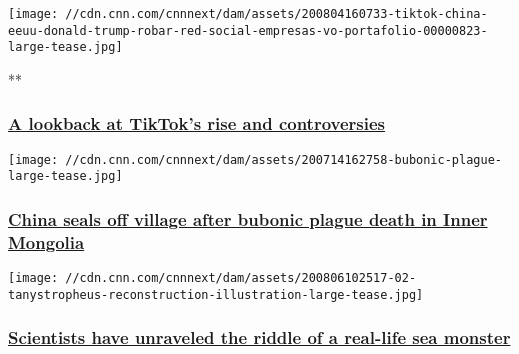 \href{/videos/tech/2020/08/07/trump-us-ban-tiktok-china-gold-intl-hnk-vpx.cnn}{}

\texttt{[image: //cdn.cnn.com/cnnnext/dam/assets/200804160733-tiktok-china-eeuu-donald-trump-robar-red-social-empresas-vo-portafolio-00000823-large-tease.jpg]}

**

\hypertarget{a-lookback-at-tiktoks-rise-and-controversies}{%
\subsubsection{\texorpdfstring{\href{/videos/tech/2020/08/07/trump-us-ban-tiktok-china-gold-intl-hnk-vpx.cnn}{A
lookback at TikTok's rise and
controversies}}{A lookback at TikTok's rise and controversies}}\label{a-lookback-at-tiktoks-rise-and-controversies}}

\href{/2020/08/07/asia/china-mongolia-bubonic-plague-death-intl-hnk-scli-scn/index.html}{}

\texttt{[image: //cdn.cnn.com/cnnnext/dam/assets/200714162758-bubonic-plague-large-tease.jpg]}

\hypertarget{china-seals-off-village-after-bubonic-plague-death-in-inner-mongolia}{%
\subsubsection{\texorpdfstring{\href{/2020/08/07/asia/china-mongolia-bubonic-plague-death-intl-hnk-scli-scn/index.html}{China
seals off village after bubonic plague death in Inner
Mongolia}}{China seals off village after bubonic plague death in Inner Mongolia}}\label{china-seals-off-village-after-bubonic-plague-death-in-inner-mongolia}}

\href{/2020/08/06/world/scientists-fossil-mystery-tanystropheus-scn-trnd/index.html}{}

\texttt{[image: //cdn.cnn.com/cnnnext/dam/assets/200806102517-02-tanystropheus-reconstruction-illustration-large-tease.jpg]}

\hypertarget{scientists-have-unraveled-the-riddle-of-a-real-life-sea-monster}{%
\subsubsection{\texorpdfstring{\href{/2020/08/06/world/scientists-fossil-mystery-tanystropheus-scn-trnd/index.html}{Scientists
have unraveled the riddle of a real-life sea
monster}}{Scientists have unraveled the riddle of a real-life sea monster}}\label{scientists-have-unraveled-the-riddle-of-a-real-life-sea-monster}}

